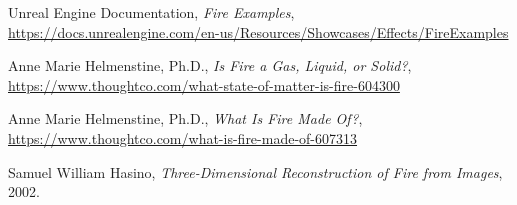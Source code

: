 \begin{thebibliography}{x}
 Unreal Engine Documentation, 
 \textit{Fire Examples},\\
 \url{https://docs.unrealengine.com/en-us/Resources/Showcases/Effects/FireExamples}

 Anne Marie Helmenstine, Ph.D., 
 \textit{Is Fire a Gas, Liquid, or Solid?},\\
 \url{https://www.thoughtco.com/what-state-of-matter-is-fire-604300}

 Anne Marie Helmenstine, Ph.D., 
 \textit{What Is Fire Made Of?},\\
 \url{https://www.thoughtco.com/what-is-fire-made-of-607313}

  Samuel William Hasino,
  \textit{Three-Dimensional Reconstruction of Fire from Images},
 2002.

\end{thebibliography}

